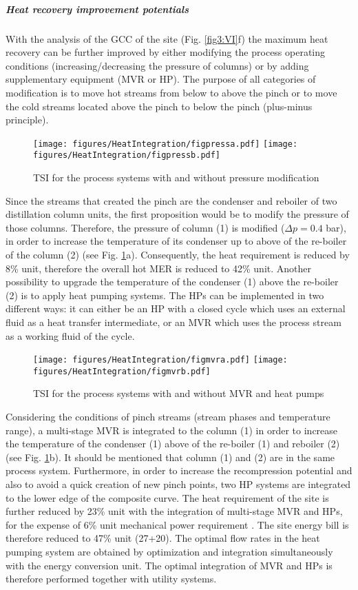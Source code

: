  \subparagraph{Heat recovery improvement potentials}

With the analysis of the GCC of the site (Fig. \ref{fig3:VI}f) the maximum heat recovery can be further improved by either modifying the process operating conditions (increasing/decreasing the pressure of columns) or by adding supplementary equipment (MVR or HP). The purpose of all categories of modification is to move hot streams from  below to above the pinch or to move the cold streams located above the pinch to below the pinch (plus-minus principle). 

\begin{figure}[!ht]
\centering
\texttt{[image: figures/HeatIntegration/figpressa.pdf]}
\texttt{[image: figures/HeatIntegration/figpressb.pdf]}
\caption{TSI for the process systems with and without pressure modification}
\label{fig3:VII}
\end{figure}

 Since the  streams that created the pinch are the condenser and reboiler of two distillation column units, the first proposition would be to modify the pressure of those columns. Therefore, the pressure of column (1) is modified ($\Delta p=0.4$ bar), in order to increase the temperature of its condenser up to above of the re-boiler of the column (2) (see Fig. \ref{fig3:VII}a). Consequently, the heat requirement is reduced by 8\% unit, therefore the overall hot MER is reduced to 42\% unit. Another possibility to upgrade the temperature of the condenser (1) above the re-boiler (2) is to apply heat pumping systems. The HPs can be implemented in two different ways: it can either be an HP with a closed cycle which uses an external fluid as a heat transfer intermediate, or an MVR which uses the process stream as a working fluid of the cycle. 
 
 \begin{figure}[!ht]
\centering
\texttt{[image: figures/HeatIntegration/figmvra.pdf]}
\texttt{[image: figures/HeatIntegration/figmvrb.pdf]}
\caption{TSI for the process systems with and without  MVR and heat pumps}
\label{fig3:VIII}
\end{figure}

 Considering the conditions of pinch streams (stream phases and temperature range), a multi-stage MVR is integrated to the column (1) in order to increase the temperature of the condenser (1) above of the re-boiler (1) and reboiler (2) (see Fig. \ref{fig3:VII}b). It should be mentioned that column (1) and (2) are in the same process system. Furthermore, in order to increase the recompression potential and also to avoid a quick creation of new pinch points, two HP systems are integrated to the lower edge of the composite curve. The heat requirement of the site is further reduced by 23\% unit with the integration of multi-stage MVR and HPs, for the expense of 6\% unit mechanical power requirement . The site energy bill is therefore reduced to 47\% unit (27+20). The optimal flow rates in the heat pumping system are obtained by optimization and integration simultaneously with the energy conversion unit. The optimal integration of MVR and HPs is therefore performed together with utility systems. 
 
